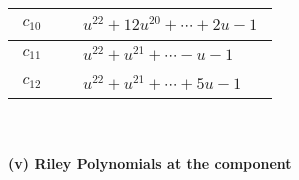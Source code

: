 \documentclass[1p]{elsarticle_modified}
\theoremstyle{definition}
\begin{document}
\begin{tabular}{m{50pt}|m{274pt}}
\hline $$\begin{aligned}c_{10}\end{aligned}$$&$\begin{aligned}
&u^{22}+12 u^{20}+\cdots+2 u-1
\end{aligned}$\\
\hline $$\begin{aligned}c_{11}\end{aligned}$$&$\begin{aligned}
&u^{22}+u^{21}+\cdots- u-1
\end{aligned}$\\
\hline $$\begin{aligned}c_{12}\end{aligned}$$&$\begin{aligned}
&u^{22}+u^{21}+\cdots+5 u-1
\end{aligned}$\\
\hline
\end{tabular}\\~\\
\newpage\renewcommand{\arraystretch}{1}
\flushleft \textbf{(v) Riley Polynomials at the component}\newline \\
\end{document}
